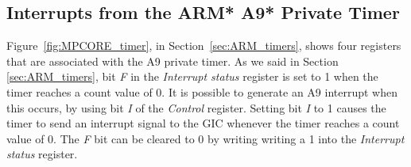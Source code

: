 \subsection{Interrupts from the ARM* A9* Private Timer}

Figure~\ref{fig:MPCORE_timer}, in Section~\ref{sec:ARM_timers}, shows four registers that
are associated with the A9 private timer. As we said in Section \ref{sec:ARM_timers}, bit
{\it F} in the {\it Interrupt status} register is set to 1 when the timer reaches a count 
value of 0. It is possible to generate an A9 interrupt when this occurs, by using bit {\it I}
of the {\it Control} register.  Setting bit {\it I} to 1 causes the timer to send an
interrupt signal to the GIC whenever the timer reaches a count value of 0. 
The {\it F} bit can be cleared to 0 by writing writing a 1 into the 
{\it Interrupt status} register.


